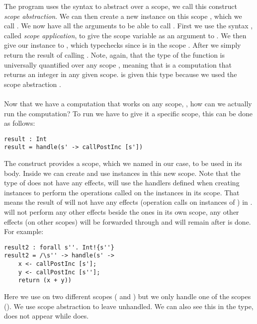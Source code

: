 The program  uses the syntax \ident{/\s ->} to abstract over a scope, we call this construct \emph{scope abstraction}.
We can then create a new  instance on this scope , which we call .
We now have all the arguments to be able to call .
First we use the syntax , called \emph{scope application}, to give the scope variable as an argument to .
We then give our instance  to , which typechecks since  is in the scope .
After we simply return the result of calling .
Note, again, that the type of the function is universally quantified over any scope ,
meaning that  is a computation that returns an integer in any given scope.
 is given this  type because we used the scope abstraction \ident{/\s ->}.
\\\\
Now that we have a computation that works on any scope, , how can we actually run the computation?
To run  we have to give it a specific scope, this can be done as follows:

\begin{verbatim}
result : Int
result = handle(s' -> callPostInc [s'])
\end{verbatim}

The  construct provides a scope, which we named  in our case, to be used in its body.
Inside  we can create and use instances in this new scope.
Note that the type of  does not have any effects,  will use the handlers defined when creating instances to perform the operations called on the instances in its scope.
That means the result of  will not have any effects (operation calls on instances of ) in .
 will not perform any other effects beside the ones in its own scope, any other effects (on other scopes) will be forwarded through and will remain after  is done.
For example:

\begin{verbatim}
result2 : forall s''. Int!{s''}
result2 = /\s'' -> handle(s' ->
	x <- callPostInc [s'];
	y <- callPostInc [s''];
	return (x + y))
\end{verbatim}

Here we use  on two different scopes ( and ) but we only handle one of the scopes ().
We use scope abstraction to leave  unhandled.
We can also see this in the type,  does not appear while  does. 

